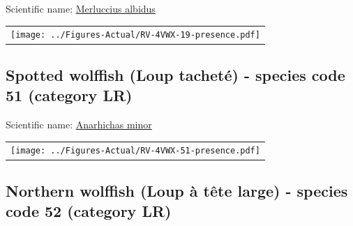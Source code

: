 \documentclass[12pt]{article}\usepackage[]{graphicx}\usepackage[]{color}
\begin{document}

Scientific name: \href{http://www.marinespecies.org/aphia.php?p=taxdetails\&id=158748}{Merluccius albidus} \newline
\begin{minipage}{1.0\textwidth}
 \begin{tabular}{c}
\texttt{[image: ../Figures-Actual/RV-4VWX-19-presence.pdf]} \\ 
\end{tabular} 
\end{minipage}
\clearpage

\renewcommand\thefigure{\thesubsection\Alph{figure}}

\setcounter{figure}{0}

\hypertarget{sec:51}{%
\subsection{Spotted wolffish (Loup tacheté) - species code 51 (category LR)}\label{sec:51}}

  


Scientific name: \href{http://www.marinespecies.org/aphia.php?p=taxdetails\&id=126759}{Anarhichas minor} \newline
\begin{minipage}{1.0\textwidth}
 \begin{tabular}{c}
\texttt{[image: ../Figures-Actual/RV-4VWX-51-presence.pdf]} \\ 
\end{tabular} 
\end{minipage}
\clearpage

\renewcommand\thefigure{\thesubsection\Alph{figure}}

\setcounter{figure}{0}

\hypertarget{sec:52}{%
\subsection{Northern wolffish (Loup à tête large) - species code 52 (category LR)}\label{sec:52}}

  

\end{document}
